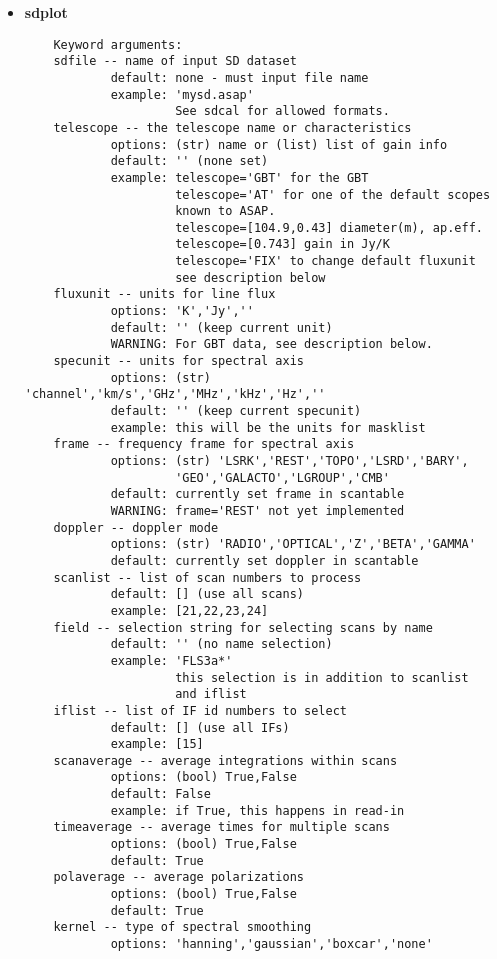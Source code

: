 \begin{itemize}
\item {\bf sdplot}

\begin{verbatim}
    Keyword arguments:
    sdfile -- name of input SD dataset
            default: none - must input file name
            example: 'mysd.asap'
                     See sdcal for allowed formats.
    telescope -- the telescope name or characteristics
            options: (str) name or (list) list of gain info
            default: '' (none set)
            example: telescope='GBT' for the GBT
                     telescope='AT' for one of the default scopes
                     known to ASAP.
                     telescope=[104.9,0.43] diameter(m), ap.eff.
                     telescope=[0.743] gain in Jy/K
                     telescope='FIX' to change default fluxunit
                     see description below
    fluxunit -- units for line flux
            options: 'K','Jy',''
            default: '' (keep current unit)
            WARNING: For GBT data, see description below.
    specunit -- units for spectral axis
            options: (str) 'channel','km/s','GHz','MHz','kHz','Hz',''
            default: '' (keep current specunit)
            example: this will be the units for masklist
    frame -- frequency frame for spectral axis
            options: (str) 'LSRK','REST','TOPO','LSRD','BARY',
                     'GEO','GALACTO','LGROUP','CMB'
            default: currently set frame in scantable
            WARNING: frame='REST' not yet implemented
    doppler -- doppler mode
            options: (str) 'RADIO','OPTICAL','Z','BETA','GAMMA'
            default: currently set doppler in scantable
    scanlist -- list of scan numbers to process
            default: [] (use all scans)
            example: [21,22,23,24]
    field -- selection string for selecting scans by name
            default: '' (no name selection)
            example: 'FLS3a*'
                     this selection is in addition to scanlist
                     and iflist
    iflist -- list of IF id numbers to select
            default: [] (use all IFs)
            example: [15]
    scanaverage -- average integrations within scans
            options: (bool) True,False
            default: False
            example: if True, this happens in read-in
    timeaverage -- average times for multiple scans
            options: (bool) True,False
            default: True
    polaverage -- average polarizations
            options: (bool) True,False
            default: True
    kernel -- type of spectral smoothing
            options: 'hanning','gaussian','boxcar','none'

\end{verbatim}
\end{itemize}
